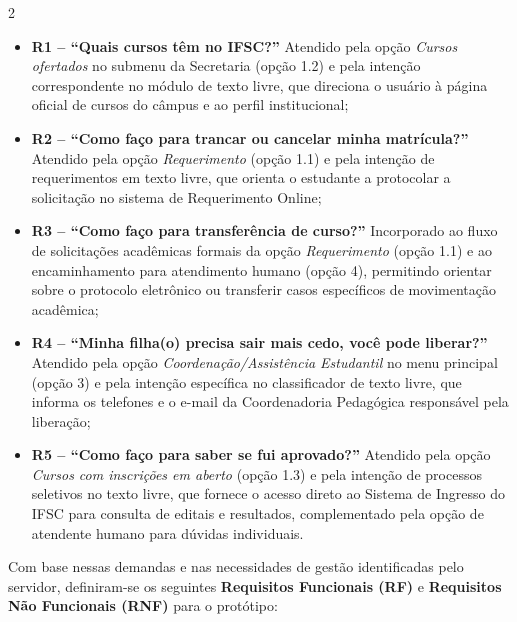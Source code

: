 \documentclass[10pt]{article}
\begin{document}
\begin{multicols}{2}
\begin{itemize}
  \item \textbf{R1 -- ``Quais cursos têm no IFSC?''} Atendido pela
  opção \textit{Cursos ofertados} no submenu da Secretaria (opção 1.2) e
  pela intenção correspondente no módulo de texto livre, que direciona o
  usuário à página oficial de cursos do câmpus e ao perfil institucional;
  \item \textbf{R2 -- ``Como faço para trancar ou cancelar minha
  matrícula?''} Atendido pela opção \textit{Requerimento} (opção 1.1) e
  pela intenção de requerimentos em texto livre, que orienta o estudante
  a protocolar a solicitação no sistema de Requerimento Online;
  \item \textbf{R3 -- ``Como faço para transferência de curso?''}
  Incorporado ao fluxo de solicitações acadêmicas formais da opção
  \textit{Requerimento} (opção 1.1) e ao encaminhamento para atendimento
  humano (opção 4), permitindo orientar sobre o protocolo eletrônico ou
  transferir casos específicos de movimentação acadêmica;
  \item \textbf{R4 -- ``Minha filha(o) precisa sair mais cedo, você pode
  liberar?''} Atendido pela opção \textit{Coordenação/Assistência
  Estudantil} no menu principal (opção 3) e pela intenção específica no
  classificador de texto livre, que informa os telefones e o e-mail da
  Coordenadoria Pedagógica responsável pela liberação;
  \item \textbf{R5 -- ``Como faço para saber se fui aprovado?''}
  Atendido pela opção \textit{Cursos com inscrições em aberto} (opção
  1.3) e pela intenção de processos seletivos no texto livre, que
  fornece o acesso direto ao Sistema de Ingresso do IFSC para consulta
  de editais e resultados, complementado pela opção de atendente humano
  para dúvidas individuais.
\end{itemize}

Com base nessas demandas e nas necessidades de gestão identificadas pelo
servidor, definiram-se os seguintes \textbf{Requisitos Funcionais (RF)} e
\textbf{Requisitos Não Funcionais (RNF)} para o protótipo:


\end{multicols}
\end{document}
